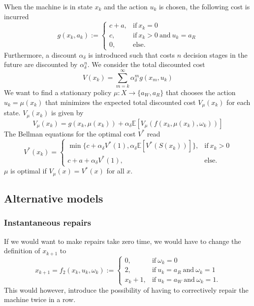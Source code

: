 When the machine is in state $x_k$ and the action $u_k$ is chosen, the following cost is incurred
\begin{equation}
g(x_k,a_k):=\begin{cases}
c+a,&\text{if}\ x_k=0 \\
c,&\text{if}\ x_k>0\ \text{and}\ u_k=a_R \\
0,&\text{else}.
\end{cases}
\end{equation}
Furthermore, a discount $\alpha_\delta$ is introduced such that costs $n$ decision stages in the future are discounted by $\alpha_\delta^n$.
We consider the total discounted cost
\begin{equation}
V(x_k)=\sum\limits_{m=k}^\infty \alpha_\delta^mg(x_m,u_k)
\end{equation}
We want to find a stationary policy $\mu:X\rightarrow \{a_W,a_R\}$ that chooses the action $u_k=\mu(x_k)$ that minimizes the expected total discounted cost $V_\mu(x_k)$ for each state.
$V_\mu(x_k)$ is given by
$$
V_\mu(x_k)=g(x_k,\mu(x_k))+\alpha_\delta \mathbb{E}[V_\mu(f(x_k,\mu(x_k),\omega_k))]
$$
The Bellman equations for the optimal cost $V^*$ read
\begin{equation}
V^*(x_k)=\begin{cases}
\min\{c+\alpha_\delta V^*(1),\alpha_\delta \mathbb{E}[V^*(S(x_k))]\},&\text{if}\ x_k>0 \\
c+a+\alpha_\delta V^*(1),&\text{else.}
\end{cases}
\end{equation}
$\mu$ is optimal if $V_\mu(x)=V^*(x)$ for all $x$.

\subsection{Alternative models}
\subsubsection{Instantaneous repairs}
If we would want to make repairs take zero time, we would have to change the definition of $x_{k+1}$ to 
\begin{equation}
x_{k+1}=f_2(x_k,u_k,\omega_k):=\begin{cases}
0,&\text{if}\ \omega_k=0 \\
2,&\text{if}\ u_k=a_R\ \text{and}\ \omega_k=1\\
x_k+1,&\text{if}\ u_k=a_W\ \text{and}\ \omega_k=1.
\end{cases}
\end{equation}
This would however, introduce the possibility of having to correctively repair the machine twice in a row.


